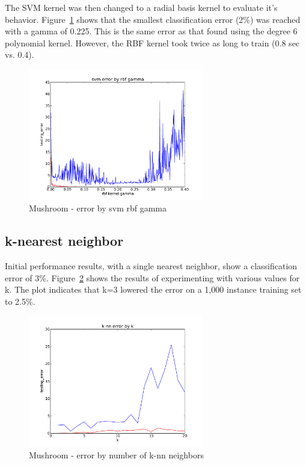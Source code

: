 \documentclass{sig-alternate}
\begin{document}
The SVM kernel was then changed to a radial basis kernel to evaluate it's behavior. Figure~\ref{ag-svm-rbf} shows that the smallest classification error (2\%) was reached with a gamma of 0.225. This is the same error as that found using the degree 6 polynomial kernel. However, the RBF kernel took twice as long to train (0.8 sec vs. 0.4).

\begin{figure}[!htbp]
    \centering
    \includegraphics[width=3in]{data/agaricus-lepiota/svm/rbf.pdf}
    \caption{Mushroom - error by svm rbf gamma\label{ag-svm-rbf}}
\end{figure} 

\subsection{k-nearest neighbor}

Initial performance results, with a single nearest neighbor, show a classification error of 3\%. Figure~\ref{ag-knn-k} shows the results of experimenting with various values for k. The plot indicates that k=3 lowered the error on a 1,000 instance training set to 2.5\%. 

\begin{figure}[!htbp]
    \centering
    \includegraphics[width=3in]{data/agaricus-lepiota/k-nn/k.pdf}
    \caption{Mushroom - error by number of k-nn neighbors\label{ag-knn-k}}
\end{figure} 
\end{document}
